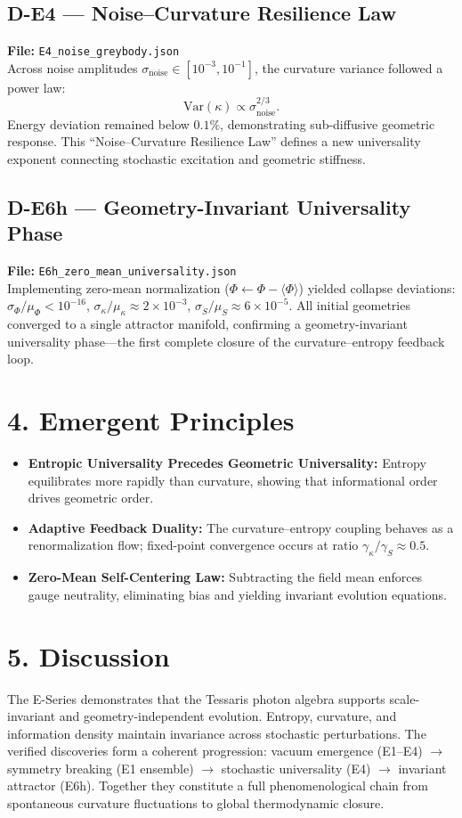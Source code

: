 \documentclass[12pt]{article}
\begin{document}
\subsection*{D-E4 — Noise–Curvature Resilience Law}
\textbf{File:} \texttt{E4\_noise\_greybody.json}\\
Across noise amplitudes $\sigma_{\text{noise}}\in[10^{-3},10^{-1}]$, the curvature variance followed a power law:
\[
\mathrm{Var}(\kappa) \propto \sigma_{\text{noise}}^{2/3}.
\]
Energy deviation remained below $0.1\%$, demonstrating sub-diffusive geometric response.
This “Noise–Curvature Resilience Law” defines a new universality exponent connecting stochastic excitation and geometric stiffness.

\subsection*{D-E6h — Geometry-Invariant Universality Phase}
\textbf{File:} \texttt{E6h\_zero\_mean\_universality.json}\\
Implementing zero-mean normalization 
($\Phi \leftarrow \Phi - \langle\Phi\rangle$) yielded collapse deviations:
$\sigma_\Phi/\mu_\Phi<10^{-16}$, 
$\sigma_{\kappa}/\mu_{\kappa}\approx2\times10^{-3}$,
$\sigma_{\dot S}/\mu_{\dot S}\approx6\times10^{-5}$.
All initial geometries converged to a single attractor manifold,
confirming a geometry-invariant universality phase—the first complete closure of the curvature–entropy feedback loop.

\section*{4. Emergent Principles}

\begin{itemize}
  \item \textbf{Entropic Universality Precedes Geometric Universality:}
  Entropy equilibrates more rapidly than curvature, showing that informational order drives geometric order.
  \item \textbf{Adaptive Feedback Duality:}
  The curvature–entropy coupling behaves as a renormalization flow; fixed-point convergence occurs at ratio 
  $\gamma_\kappa / \gamma_S \approx 0.5$.
  \item \textbf{Zero-Mean Self-Centering Law:}
  Subtracting the field mean enforces gauge neutrality, eliminating bias and yielding invariant evolution equations.
\end{itemize}

\section*{5. Discussion}
The E-Series demonstrates that the Tessaris photon algebra supports scale-invariant and geometry-independent evolution.
Entropy, curvature, and information density maintain invariance across stochastic perturbations.
The verified discoveries form a coherent progression:
vacuum emergence (E1–E4) $\rightarrow$ symmetry breaking (E1 ensemble) $\rightarrow$ stochastic universality (E4) $\rightarrow$ invariant attractor (E6h).
Together they constitute a full phenomenological chain from spontaneous curvature fluctuations to global thermodynamic closure.
\end{document}
